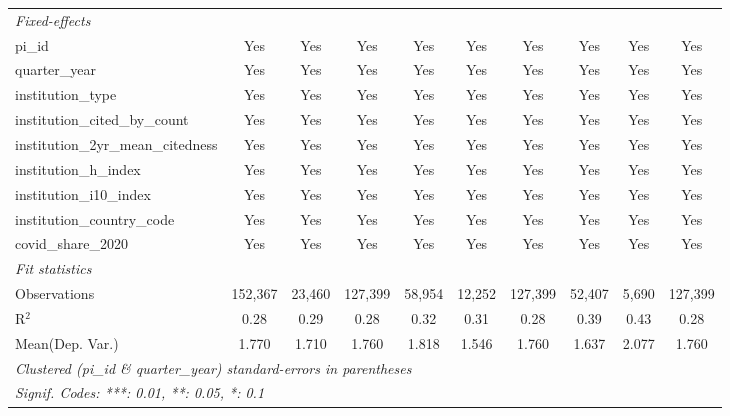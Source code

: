\begin{tabular}{lccccccccc}
   \midrule
   \emph{Fixed-effects}\\
   pi\_id                                                      & Yes           & Yes            & Yes           & Yes            & Yes            & Yes           & Yes            & Yes            & Yes\\  
   quarter\_year                                               & Yes           & Yes            & Yes           & Yes            & Yes            & Yes           & Yes            & Yes            & Yes\\  
   institution\_type                                           & Yes           & Yes            & Yes           & Yes            & Yes            & Yes           & Yes            & Yes            & Yes\\  
   institution\_cited\_by\_count                               & Yes           & Yes            & Yes           & Yes            & Yes            & Yes           & Yes            & Yes            & Yes\\  
   institution\_2yr\_mean\_citedness                           & Yes           & Yes            & Yes           & Yes            & Yes            & Yes           & Yes            & Yes            & Yes\\  
   institution\_h\_index                                       & Yes           & Yes            & Yes           & Yes            & Yes            & Yes           & Yes            & Yes            & Yes\\  
   institution\_i10\_index                                     & Yes           & Yes            & Yes           & Yes            & Yes            & Yes           & Yes            & Yes            & Yes\\  
   institution\_country\_code                                  & Yes           & Yes            & Yes           & Yes            & Yes            & Yes           & Yes            & Yes            & Yes\\  
   covid\_share\_2020                                          & Yes           & Yes            & Yes           & Yes            & Yes            & Yes           & Yes            & Yes            & Yes\\  
   \midrule
   \emph{Fit statistics}\\
   Observations                                                & 152,367       & 23,460         & 127,399       & 58,954         & 12,252         & 127,399       & 52,407         & 5,690          & 127,399\\  
   R$^2$                                                       & 0.28          & 0.29           & 0.28          & 0.32           & 0.31           & 0.28          & 0.39           & 0.43           & 0.28\\  
Mean(Dep. Var.) & 1.770 & 1.710 & 1.760 & 1.818 & 1.546 & 1.760 & 1.637 & 2.077 & 1.760 \\
   \midrule \midrule
   \multicolumn{10}{l}{\emph{Clustered (pi\_id \& quarter\_year) standard-errors in parentheses}}\\
   \multicolumn{10}{l}{\emph{Signif. Codes: ***: 0.01, **: 0.05, *: 0.1}}\\
\end{tabular}
\par\endgroup
